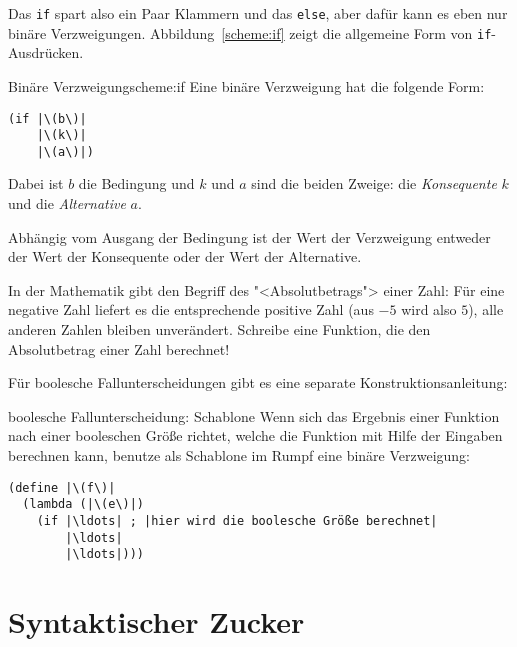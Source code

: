 %
Das \lstinline{if} spart also ein Paar Klammern und das \lstinline{else},
aber dafür kann es eben nur binäre Verzweigungen.
Abbildung~\ref{scheme:if} zeigt die allgemeine Form von
\lstinline{if}-Ausdrücken.
\begin{feature}{Binäre Verzweigung}{scheme:if}
  Eine binäre Verzweigung hat die folgende Form:
\begin{lstlisting}
(if |\(b\)|
    |\(k\)|
    |\(a\)|)
\end{lstlisting}
Dabei ist $b$ die Bedingung und $k$ und $a$ sind die
beiden Zweige: die \textit{Konsequente} $k$ und die
\textit{Alternative} $a$.

Abhängig vom Ausgang der
Bedingung ist der Wert der Verzweigung entweder der Wert der Konsequente
oder der Wert der Alternative.
\end{feature}
%
\begin{aufgabeinline}
  In der Mathematik gibt den Begriff des "<Absolutbetrags"> einer
  Zahl: Für eine negative Zahl liefert es die entsprechende positive
  Zahl (aus $-5$ wird also $5$), alle anderen Zahlen bleiben
  unverändert.  Schreibe eine Funktion, die den Absolutbetrag einer
  Zahl berechnet!
\end{aufgabeinline}
%
Für boolesche Fallunterscheidungen gibt es eine separate
Konstruktionsanleitung:
%
\begin{konstruktionsanleitung}{boolesche Fallunterscheidung: Schablone}
  \label{ka:boolesche-fallunterscheidung}
  Wenn sich das Ergebnis einer Funktion nach einer booleschen Größe
  richtet, welche die Funktion mit Hilfe der Eingaben berechnen kann,
  benutze als Schablone im Rumpf eine binäre Verzweigung:
\begin{lstlisting}
(define |\(f\)|
  (lambda (|\(e\)|)
    (if |\ldots| ; |hier wird die boolesche Größe berechnet|
        |\ldots|
        |\ldots|)))
\end{lstlisting}
\end{konstruktionsanleitung}

\section{Syntaktischer Zucker}

